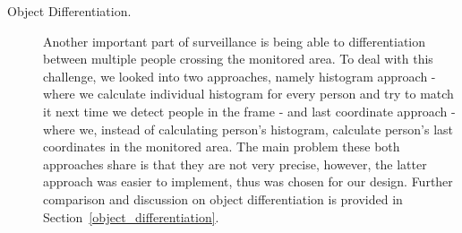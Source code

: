 \begin{description}
\item[Object Differentiation.] Another important part of surveillance is being able to differentiation between multiple people crossing the monitored area. To deal with this challenge, we looked into two approaches, namely histogram approach - where we calculate individual histogram for every person and try to match it next time we detect people in the frame - and last coordinate approach - where we, instead of calculating person's histogram, calculate person's last coordinates in the monitored area. The main problem these both approaches share is that they are not very precise, however, the latter approach was easier to implement, thus was chosen for our design. Further comparison and discussion on object differentiation is provided in Section~\ref{object_differentiation}.
\end{description}